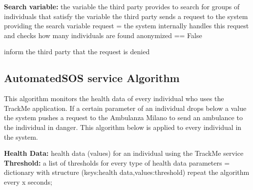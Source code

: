 \documentclass[12pt]{article}
\begin{document}
\begin{algorithm}[H]
 \textbf{Search variable:} the variable the third party provides to search for groups of individuals that satisfy the variable\;
 \vspace{1mm}
 the third party sends a request to the system providing the search variable\;\vspace{1mm}
 request = the system internally handles this request and checks how many individuals are found\;\vspace{1mm}
    {    
    anonymized == False\;   
    }  
 
    {    
    inform the third party that the request is denied\;   
    }  
 \vspace{5mm}
 \caption{Access anonymized Health Data of groups of an Individuals.}
\end{algorithm}

\newpage

\subsection{AutomatedSOS service Algorithm}
This algorithm monitors the health data of every individual who uses the TrackMe application. If a certain  parameter of an individual drops below a value the system pushes a request to the Ambulanza Milano to send an ambulance to the individual in danger.
This algorithm below is applied to every individual in the system.
\vspace{5mm}

\begin{algorithm}[H]
 \textbf{Health Data:} health data (values) for an individual using the TrackMe service\;
 \vspace{1mm}
  \textbf{Threshold:} a list of thresholds for every type of health data\;
 \vspace{1mm}
 parameters = dictionary with structure (keys:health data,values:threshold)\;\vspace{1mm}
 \noindent {}  
 repeat the algorithm every x seconds;
 
 \vspace{5mm}
 \caption{AutomatedSOS service.}
\end{algorithm}
\end{document}
